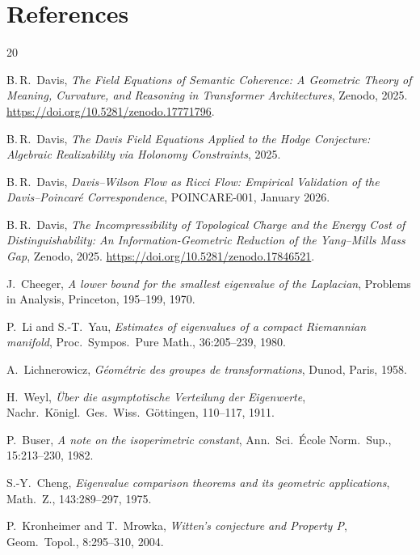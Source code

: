 \documentclass[11pt]{article}
\theoremstyle{definition}
\theoremstyle{remark}
\begin{document}
\section*{References}

\begin{thebibliography}{20}

B.\,R.\ Davis,
\emph{The Field Equations of Semantic Coherence: A Geometric Theory of Meaning, Curvature, and Reasoning in Transformer Architectures},
Zenodo, 2025.
\url{https://doi.org/10.5281/zenodo.17771796}.

B.\,R.\ Davis,
\emph{The Davis Field Equations Applied to the Hodge Conjecture: Algebraic Realizability via Holonomy Constraints},
2025.

B.\,R.\ Davis,
\emph{Davis--Wilson Flow as Ricci Flow: Empirical Validation of the Davis--Poincar\'{e} Correspondence},
POINCARE-001, January 2026.

B.\,R.\ Davis,
\emph{The Incompressibility of Topological Charge and the Energy Cost of Distinguishability: An Information-Geometric Reduction of the Yang--Mills Mass Gap},
Zenodo, 2025.
\url{https://doi.org/10.5281/zenodo.17846521}.

J.\ Cheeger,
\emph{A lower bound for the smallest eigenvalue of the Laplacian},
Problems in Analysis, Princeton, 195--199, 1970.

P.\ Li and S.-T.\ Yau,
\emph{Estimates of eigenvalues of a compact Riemannian manifold},
Proc.\ Sympos.\ Pure Math., 36:205--239, 1980.

A.\ Lichnerowicz,
\emph{G\'{e}om\'{e}trie des groupes de transformations},
Dunod, Paris, 1958.

H.\ Weyl,
\emph{\"Uber die asymptotische Verteilung der Eigenwerte},
Nachr.\ K\"{o}nigl.\ Ges.\ Wiss.\ G\"{o}ttingen, 110--117, 1911.

P.\ Buser,
\emph{A note on the isoperimetric constant},
Ann.\ Sci.\ \'{E}cole Norm.\ Sup., 15:213--230, 1982.

S.-Y.\ Cheng,
\emph{Eigenvalue comparison theorems and its geometric applications},
Math.\ Z., 143:289--297, 1975.

P.\ Kronheimer and T.\ Mrowka,
\emph{Witten's conjecture and Property P},
Geom.\ Topol., 8:295--310, 2004.


\end{thebibliography}
\end{document}
